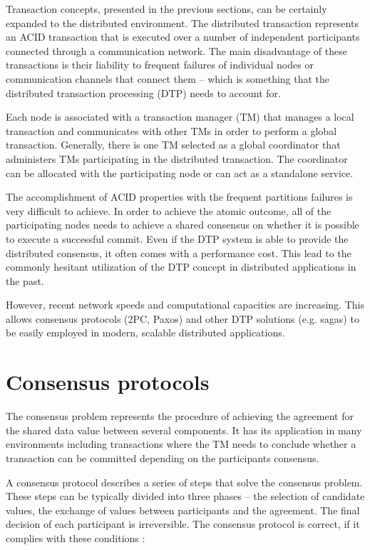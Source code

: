 \documentclass[oneside,
  digital, %
  table,   %
  nolof,     %
  nolot,     %
]{fithesis3}
\begin{document}
Transaction concepts, presented in the previous sections, can be certainly expanded to the distributed environment. The distributed transaction represents an ACID transaction that is executed over a number of independent participants connected through a communication network. The main disadvantage of these transactions is their liability to frequent failures of individual nodes or communication channels that connect them -- which is something that the distributed transaction processing (DTP) needs to account for. 

Each node is associated with a transaction manager (TM) that manages a local transaction and communicates with other TMs in order to perform a global transaction. Generally, there is one TM selected as a global coordinator that administers TMs participating in the distributed transaction. The coordinator can be allocated with the participating node or can act as a standalone service.

The accomplishment of ACID properties with the frequent partitions failures is very difficult to achieve. In order to achieve the atomic outcome, all of the participating nodes needs to achieve a shared consensus on whether it is possible to execute a successful commit. Even if the DTP system is able to provide the distributed consensus, it often comes with a performance cost. This lead to the commonly hesitant utilization of the DTP concept in distributed applications in the past. 

However, recent network speeds and computational capacities are increasing. This allows consensus protocols (2PC, Paxos) and other DTP solutions (e.g. sagas) to be easily employed in modern, scalable distributed applications.



\section{Consensus protocols}
\label{sec:consensus-protocols}

The consensus problem represents the procedure of achieving the  agreement for the shared data value between several components. It has its application in many environments including transactions where the TM needs to conclude whether a transaction can be committed depending on the participants consensus.

A consensus protocol describes a series of steps that solve the consensus problem. These steps can be typically divided into three phases -- the selection of candidate values, the exchange of values between participants and the agreement. The final decision of each participant is irreversible. The consensus protocol is correct, if it complies with these conditions \cite{distributed-computing}:
\end{document}
